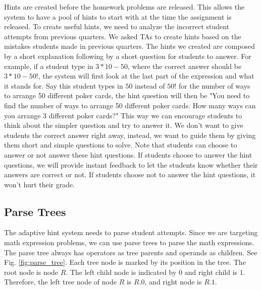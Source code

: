 \documentclass{llncs}
\begin{document}
Hints are created before the homework problems are released. This allows the system to have a pool of hints to start with at the time the assignment is released. To create useful hints, we need to analyze the incorrect student attempts from previous quarters. We asked TAs to create hints based on the mistakes students made in previous quarters. The hints we created are composed by a short explanation following by a short question for students to answer. For example, if a student type in $3*10-50$, where the correct answer should be $3*10-50!$, the system will first look at the last part of the expression and what it stands for. Say this student types in $50$ instead of $50!$ for the number of ways to arrange 50 different poker cards, the hint question will then be "You need to find the number of ways to arrange 50 different poker cards. How many ways can you arrange 3 different poker cards?" This way we can encourage students to think about the simpler question and try to answer it. We don't want to give students the correct answer right away, instead, we want to guide them by giving them short and simple questions to solve. Note that students can choose to answer or not answer these hint questions. If students choose to answer the hint questions, we will provide instant feedback to let the students know whether their answers are correct or not. If students choose not to answer the hint questions, it won't hurt their grade.

\subsection*{Parse Trees}
The adaptive hint system needs to parse student attempts. Since we are targeting math expression problems, we can use parse trees to parse the math expressions. The parse tree always has operators as tree parents and operands as children. See Fig. \ref{fig:parse_tree}. Each tree node is marked by its position in the tree. The root node is node $R$. The left child node is indicated by $0$ and right child is $1$. Therefore, the left tree node of node $R$ is $R.0$, and right node is $R.1$. 
\end{document}
